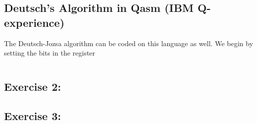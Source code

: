 \subsection{Deutsch's Algorithm in Qasm (IBM Q-experience)}
The Deutsch-Jozsa algorithm can be coded on this language as well. We begin by setting the bits in the register 
\begin{lstlisting}[language=Python,float=h]


\end{lstlisting}

\subsection{Exercise 2:}
\subsection{Exercise 3:}